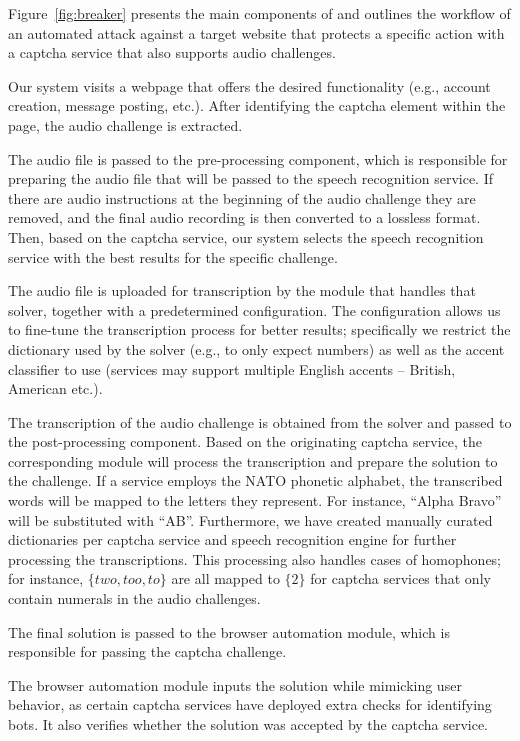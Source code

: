Figure~\ref{fig:breaker} presents the main components of \system and outlines the workflow of
an automated attack against a target website that protects a specific action with a captcha 
service that also supports audio challenges.

\protect{} Our system visits a webpage that offers the desired functionality 
(e.g., account creation, message posting, etc.). After identifying the captcha element within 
the page, the audio challenge is extracted.

\protect{} The audio file is passed to the pre-processing component, which is responsible 
for preparing the audio file that will be passed to the speech recognition service. If there are audio 
instructions at the beginning of the audio challenge they are removed, and the final audio
recording is then converted to a lossless format. Then, based on the captcha service, our system
selects the speech recognition service with the best results for the specific challenge.

\protect{} The audio file is uploaded for transcription by the module that handles that solver, 
together with a predetermined configuration. The configuration allows us to fine-tune the transcription process
for better results; specifically we restrict the dictionary used by the solver (e.g., to only expect  
numbers) as well as the accent classifier to use (services may support multiple English accents 
-- British, American etc.).

\protect{} The transcription of the audio challenge is obtained from the solver 
and passed to the post-processing component. Based on the originating captcha service, the corresponding  
module will process the transcription and prepare the solution to the challenge. If a service employs the 
NATO phonetic alphabet, the transcribed words will be mapped to the letters they represent. For instance, 
``Alpha Bravo'' will be substituted with ``AB''. Furthermore, we have created manually curated dictionaries
per captcha service and speech recognition engine for further processing the transcriptions. This processing
also handles cases of homophones; for instance, $\{two,too,to\}$ are all
mapped to $\{2\}$ for captcha services that only contain numerals in the audio challenges.

\protect{} The final solution is passed to the browser automation module,
which is responsible for passing the captcha challenge.

\protect{} The browser automation module inputs the solution while mimicking 
user behavior, as certain captcha services have deployed extra checks for identifying bots.
It also verifies whether the solution was accepted by the captcha service.

